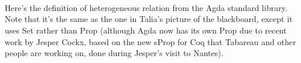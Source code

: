 \documentclass{article}
\begin{document}
\begin{code}
\AgdaSymbol{)}\AgdaSpace{}%
\AgdaSpace{}%
\AgdaSpace{}%
\AgdaSpace{}%
\AgdaSymbol{(}\AgdaSpace{}%
\AgdaSymbol{)}\<%
\\
\>[0]\AgdaSpace{}%
\<%
\\
%
\\[\AgdaEmptyExtraSkip]%
\>[0]\AgdaSpace{}%
\AgdaSpace{}%
\AgdaSymbol{\{}\AgdaSpace{}%
\AgdaSpace{}%
\AgdaSymbol{:}\AgdaSpace{}%
\AgdaSymbol{\}}\AgdaSpace{}%
\AgdaSymbol{(}\AgdaSpace{}%
\AgdaSymbol{:}\AgdaSpace{}%
\AgdaSpace{}%
\AgdaSymbol{)}\AgdaSpace{}%
\AgdaSymbol{(}\AgdaSpace{}%
\AgdaSymbol{:}\AgdaSpace{}%
\AgdaSpace{}%
\AgdaSymbol{)}\AgdaSpace{}%
\AgdaSymbol{:}\AgdaSpace{}%
\AgdaSpace{}%
\AgdaSymbol{(}\AgdaSpace{}%
\AgdaSpace{}%
\AgdaSymbol{)}\AgdaSpace{}%
\<%
\\
\>[0][@{}l@{\AgdaIndent{0}}]%
\>[2]\AgdaSpace{}%
\<%
\\
%
\>[2]\<%
\\
\>[2][@{}l@{\AgdaIndent{0}}]%
\>[4]\AgdaSpace{}%
\AgdaSymbol{:}\AgdaSpace{}%
\AgdaSpace{}%
\AgdaSpace{}%
\<%
\\
%
\>[4]\AgdaSpace{}%
\AgdaSymbol{:}\AgdaSpace{}%
\AgdaSpace{}%
\AgdaSpace{}%
\AgdaSpace{}%
\<%
\\
\>[0]\AgdaSpace{}%
\<%
\end{code}

Here's the definition of heterogeneous relation from the Agda standard
library. Note that it's the same as the one in Talia's picture of the
blackboard, except it uses Set rather than Prop (although Agda now has
its own Prop due to recent work by Jesper Cockx, based on the new
sProp for Coq that Tabareau and other people are working on, done
during Jesper's visit to Nantes).
\end{document}
